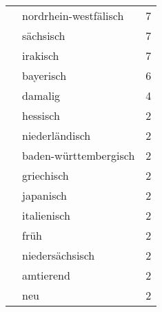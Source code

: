 \begin{tabular}{llr}
 & nordrhein-westfälisch
 & 7 \\
 & sächsisch
 & 7 \\
 & irakisch
 & 7 \\
 & bayerisch
 & 6 \\
 & damalig
 & 4 \\
 & hessisch
 & 2 \\
 & niederländisch
 & 2 \\
 & baden-württembergisch
 & 2 \\
 & griechisch
 & 2 \\
 & japanisch
 & 2 \\
 & italienisch
 & 2 \\
 & früh
 & 2 \\
 & niedersächsisch
 & 2 \\
 & amtierend
 & 2 \\
 & neu
 & 2 \\
\end{tabular}
